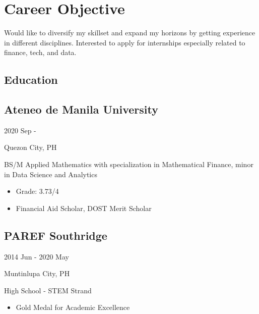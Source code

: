 




\color{grey}

\maketitle

\section{Career Objective}

Would like to diversify my skillset and expand my horizons by getting experience in different disciplines. Interested to apply for internships especially related to finance, tech, and data.
\vspace{1em}
\setlength{\columnsep}{2em} 
\begin{multicols}{2}

\section{Education}

\subsection{Ateneo de Manila University}\hfill 2020 Sep -

\hfill Quezon City, PH

\vspace{0.25em}

BS/M Applied Mathematics with specialization in Mathematical Finance, minor in Data Science and Analytics

\begin{itemize}[noitemsep, topsep=0.25em]
\item Grade: 3.73/4
\item Financial Aid Scholar, DOST Merit Scholar
\end{itemize}

\subsection{PAREF Southridge} \hfill 2014 Jun - 2020 May

\hfill Muntinlupa City, PH

\vspace{0.25em}

High School - STEM Strand

\begin{itemize}[noitemsep, topsep=0.25em]
\item Gold Medal for Academic Excellence
\end{itemize}


\end{multicols}
